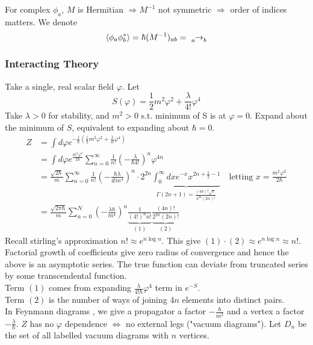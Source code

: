\documentclass{article}
\begin{document}
\begin{remark}
For complex $\phi_a$, $M$ is Hermitian $\Rightarrow M^{-1}$ not symmetric $\Rightarrow$ order of indices matters. We denote 
\[
\braket{ \phi_a \phi_b^\ast } = \hbar (M^{-1})_{ab} = \tensor[_a]{\rightarrow}{_b}
\]
\end{remark}

\subsubsection*{Interacting Theory}
Take a single, real scalar field $\varphi$. Let 
\[
S(\varphi) = \frac{1}{2} m^2 \varphi^2 + \frac{\lambda}{4!}\varphi^4
\]
Take $\lambda>0$ for stability, and $m^2>0$ s.t. minimum of S is at $\varphi = 0$. Expand about the minimum of $S$, equivalent to expanding   about $\hbar = 0$. 
\begin{align*}
Z &= \int d\varphi e^{-\frac{1}{\hbar}(\frac{1}{2} m^2 \varphi^2 + \frac{\lambda}{4!}\varphi^4)} \\
&= \int d\varphi e^{\frac{m^2\varphi^2}{2\hbar}} \sum_{n=0}^\infty \frac{1}{n!} \left( -\frac{\lambda}{\hbar 4!} \right)^n \varphi^{4n} \\
&= \frac{\sqrt{2\hbar}}{m} \sum_{n=0}^\infty \frac{1}{n!} \left( - \frac{\hbar \lambda}{4! m^4} \right)^n \cdot 2^{2n} \underbrace{\int_0^\infty dx e^{-x} x^{2n+\frac{1}{2}-1}}_{\Gamma(2n+1)=\frac{(4n)! \sqrt{\pi}}{4^{2n}(2n)!}} \quad \text{letting } x=\frac{m^2 \varphi^2}{2\hbar}\\
&= \frac{\sqrt{2\pi\hbar}}{m} \sum_{n=0}^N \left( -\frac{\lambda \hbar}{m^4}\right)^n \underbrace{\frac{1}{(4!)^n n!}}_{(1)} \underbrace{\frac{(4n)!}{2^{2n}(2n)!}}_{(2)}
\end{align*}
Recall stirling's approximation $ n! \approx e^{n\log n}$. This give $(1)\cdot(2) \approx e^{n\log n} \approx n!$. Factorial growth of coefficients give zero radius of convergence and hence the above is an asymptotic series. The true function can deviate from truncated series by some transcendental function. \\
Term $(1)$ comes from expanding $\frac{\lambda}{4! \hbar} \varphi^4$ term in $e^{-S}$. \\
Term $(2)$ is the number of ways of joining $4n$ elements into distinct pairs. \\
In Feynmann diagrams , we give a propagator a factor $-\frac{\hbar}{m^2}$ and a vertex a factor $-\frac{\lambda}{\hbar}$. 
$Z$ has no $\varphi$ dependence $\Leftrightarrow$ no external legs ("vacuum diagrams"). Let $D_n$ be the set of all labelled vacuum diagrams with $n$ vertices.
\end{document}
